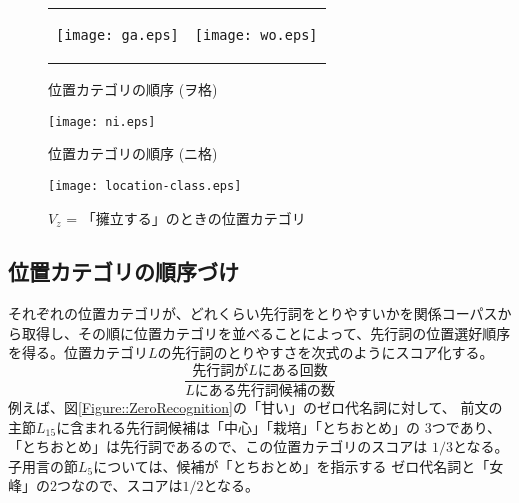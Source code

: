 \documentclass{nlp}
\begin{document}
\begin{figure}
 \begin{tabular}{@{}c@{}c@{}}
  \begin{minipage}{0.5\hsize}
   \begin{center}
    \texttt{[image: ga.eps]}
    \caption{位置カテゴリの順序 (ガ格)}
    \label{図::位置カテゴリの順序-ガ格}
   \end{center}
  \end{minipage}
  & 
  \begin{minipage}{0.5\hsize}
   \begin{center}
    \texttt{[image: wo.eps]}
    \caption{位置カテゴリの順序 (ヲ格)}
    \label{図::位置カテゴリの順序-ヲ格}
   \end{center}
  \end{minipage} \\
 \end{tabular}
\end{figure}

\begin{figure}
 \begin{center}
  \texttt{[image: ni.eps]}
  \caption{位置カテゴリの順序 (ニ格)}
  \label{図::位置カテゴリの順序-ニ格}
 \end{center}
\end{figure}

\begin{figure}
 \begin{center}
  \texttt{[image: location-class.eps]}
  \caption{$V_z$ = 「擁立する」のときの位置カテゴリ}
  \label{Figure::LocationClass}
 \end{center} 
\end{figure}


\subsection{位置カテゴリの順序づけ}

それぞれの位置カテゴリが、どれくらい先行詞をとりやすいかを関係コーパスか
ら取得し、その順に位置カテゴリを並べることによって、先行詞の位置選好順序
を得る。位置カテゴリ$L$の先行詞のとりやすさを次式のようにスコア化する。
\[
 \frac{\mbox{先行詞が}L\mbox{にある回数}}{L\mbox{にある先行詞候補の数}}
\]
例えば、図\ref{Figure::ZeroRecognition}の「甘い」のゼロ代名詞に対して、
前文の主節$L_{15}$に含まれる先行詞候補は「中心」「栽培」「とちおとめ」の
3つであり、「とちおとめ」は先行詞であるので、この位置カテゴリのスコアは
$1/3$となる。子用言の節$L_{5}$については、候補が「とちおとめ」を指示する
ゼロ代名詞と「女峰」の2つなので、スコアは$1/2$となる。
\end{document}
